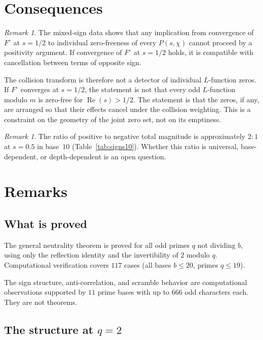 \documentclass[12pt]{amsart}
\theoremstyle{definition}
\theoremstyle{remark}
\newtheorem{remark}[theorem]{Remark}
\begin{document}
\section{Consequences}

\begin{remark}
The mixed-sign data shows that any implication from
convergence of $F^{\circ}$ at $s = 1/2$ to individual
zero-freeness of every $P(s,\chi)$ cannot proceed by a
positivity argument. If convergence of $F^{\circ}$ at
$s = 1/2$ holds, it is compatible with cancellation
between terms of opposite sign.
\end{remark}

The collision transform is therefore not a detector of
individual $L$-function zeros. If $F^{\circ}$
converges at $s = 1/2$, the statement is not that
every odd $L$-function modulo $m$ is zero-free for
$\operatorname{Re}(s) > 1/2$. The statement is that
the zeros, if any, are arranged so that their effects
cancel under the collision weighting. This is a
constraint on the geometry of the joint zero set,
not on its emptiness.

\begin{remark}
The ratio of positive to negative total magnitude is
approximately $2{:}1$ at $s = 0.5$ in base~$10$
(Table~\ref{tab:signs10}). Whether this ratio is
universal, base-dependent, or depth-dependent is an
open question.
\end{remark}

\section{Remarks}

\subsection*{What is proved}

The general neutrality theorem is proved for all odd
primes $q$ not dividing $b$, using only the reflection
identity and the invertibility of $2$ modulo $q$.
Computational verification covers $117$ cases (all
bases $b \le 20$, primes $q \le 19$).

The sign structure, anti-correlation, and scramble
behavior are computational observations supported by
$11$ prime bases with up to $666$ odd characters each.
They are not theorems.

\subsection*{The structure at $q = 2$}
\end{document}
